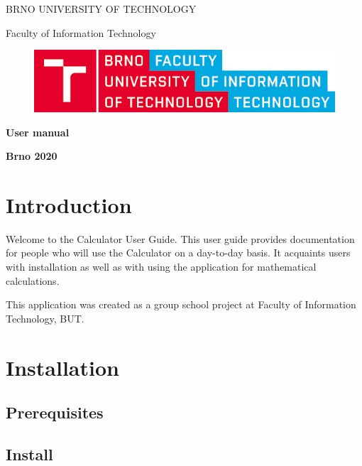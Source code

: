 \documentclass[12pt]{article}
\begin{document}
\pagestyle{empty}











\centerline{\LARGE\uppercase{Brno University of Technology}}
\vspace{1\baselineskip}
\centerline{\LARGE{Faculty of Information Technology}}
\vspace{1\baselineskip}
\begin{figure}[H]
\centering
  \includegraphics[scale=0.4]{logo.png}
  \label{fig:logo}
\end{figure}
\vspace{15\baselineskip}
\centerline{\LARGE\textbf{User manual}}

\vspace{14\baselineskip}
\centerline{\large\textbf{Brno 2020}}

\newpage
\pagestyle{plain}     
\setcounter{page}{1} 
\tableofcontents

\newpage
\setcounter{page}{1}
\section{Introduction}
Welcome to the Calculator User Guide. This user guide provides documentation for people who will use the Calculator on a day-to-day basis. It acquaints users with installation as well as with using the application for mathematical calculations.\par
This application was created as a group school project at Faculty of Information Technology, BUT.\par
\newpage
\section{Installation}
\subsection{Prerequisites}
\subsection{Install}
\end{document}
